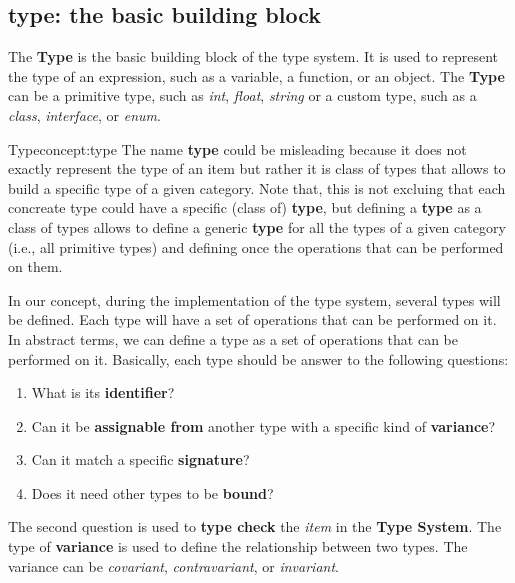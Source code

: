 \subsection{type: the basic building block}\label{subsec:concept:typethebasicbuildingblock}

The \textbf{Type} is the basic building block of the type system. It is used to represent the type of an expression, such as a variable, a function, or an object. The \textbf{Type} can be a primitive type, such as \textit{int}, \textit{float}, \textit{string} or a custom type, such as a \textit{class}, \textit{interface}, or \textit{enum}.

\begin{mydefinition}{Type}{concept:type}
The name \textbf{type} could be misleading because it does not exactly represent the type of an item but rather it is class of types that allows to build a specific type of a given category. Note that, this is not excluing that each concreate type could have a specific (class of) \textbf{type}, but defining a \textbf{type} as a class of types allows to define a generic \textbf{type} for all the types of a given category (i.e., all primitive types) and defining once the operations that can be performed on them.
\end{mydefinition}

In our concept, during the implementation of the type system, several types will be defined. Each type will have a set of operations that can be performed on it. In abstract terms, we can define a type as a set of operations that can be performed on it.
Basically, each type should be answer to the following questions:
\begin{enumerate}
    \item What is its \textbf{identifier}?
    \item Can it be \textbf{assignable from} another type with a specific kind of \textbf{variance}?
    \item Can it match a specific \textbf{signature}?
    \item Does it need other types to be \textbf{bound}?
\end{enumerate}

The second question is used to \textbf{type check} the \textit{item} in the \textbf{Type System}. The type of \textbf{variance} is used to define the relationship between two types. The variance can be \textit{covariant}, \textit{contravariant}, or \textit{invariant}.


